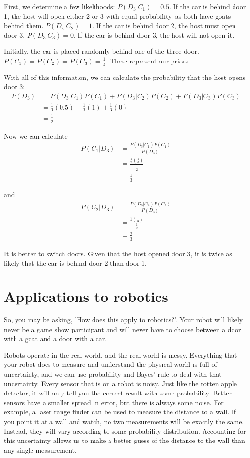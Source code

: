 \documentclass[12pt]{article} %
\begin{document}
First, we determine a few likelihoods:
$P(D_3 | C_1) = 0.5$.  If the car is behind door 1, the host will open either 2 or 3 with equal probability, as both have goats behind them.
$P(D_3 | C_2) = 1$.  If the car is behind door 2, the host must open door 3.
$P(D_3 | C_3) = 0$.  If the car is behind door 3, the host will not open it.

Initially, the car is placed randomly behind one of the three door.  $P(C_1) = P(C_2) = P(C_3) = \frac{1}{3}$.  These represent our priors.

With all of this information, we can calculate the probability that the host opens door 3:
\begin{align}
P(D_3) &= P(D_3 | C_1)P(C_1) + P(D_3 | C_2)P(C_2) + P(D_3 | C_3)P(C_3)\\
&= \frac{1}{3}(0.5) + \frac{1}{3}(1) + \frac{1}{3}(0) \\
&= \frac{1}{2}
\end{align}

Now we can calculate
\begin{align}
P(C_1 | D_3) &= \frac{P(D_3 | C_1)P(C_1)}{P(D_3)}\\
&=\frac{\frac{1}{2}(\frac{1}{3})}{\frac{1}{2}}\\
&=\frac{1}{3}
\end{align}

and
\begin{align}
P(C_2 | D_3) &= \frac{P(D_3 | C_2)P(C_2)}{P(D_3)}\\
&=\frac{1(\frac{1}{3})}{\frac{1}{2}}\\
&=\frac{2}{3}
\end{align}

It is better to switch doors.  Given that the host opened door 3, it is twice as likely that the car is behind door 2 than door 1.

\section{Applications to robotics}
So, you may be asking, 'How does this apply to robotics?'.  Your robot will likely never be a game show participant and will never have to choose between a door with a goat and a door with a car.  

Robots operate in the real world, and the real world is messy.  Everything that your robot does to measure and understand the physical world is full of uncertainty, and we can use probability and Bayes' rule to deal with that uncertainty.  Every sensor that is on a robot is noisy.  Just like the rotten apple detector, it will only tell you the correct result with some probability.  Better sensors have a smaller spread in error, but there is always some noise.  For example, a laser range finder can be used to measure the distance to a wall.  If you point it at a wall and watch, no two measurements will be exactly the same.  Instead, they will vary according to some probability distribution.  Accounting for this uncertainty allows us to make a better guess of the distance to the wall than any single measurement. 
\end{document}
